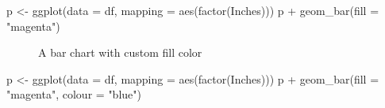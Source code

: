\documentclass[
  letterpaper,
]{article}
\newenvironment{Shaded}{\begin{snugshade}}{\end{snugshade}}
\newcommand{\AttributeTok}[1]{\textcolor[rgb]{0.40,0.45,0.13}{#1}}
\newcommand{\FunctionTok}[1]{\textcolor[rgb]{0.28,0.35,0.67}{#1}}
\newcommand{\NormalTok}[1]{\textcolor[rgb]{0.00,0.23,0.31}{#1}}
\newcommand{\OtherTok}[1]{\textcolor[rgb]{0.00,0.23,0.31}{#1}}
\newcommand{\SpecialCharTok}[1]{\textcolor[rgb]{0.37,0.37,0.37}{#1}}
\newcommand{\StringTok}[1]{\textcolor[rgb]{0.13,0.47,0.30}{#1}}
\begin{document}
\begin{Shaded}
\begin{Highlighting}[]
\NormalTok{p }\OtherTok{\textless{}{-}} \FunctionTok{ggplot}\NormalTok{(}\AttributeTok{data =}\NormalTok{ df, }\AttributeTok{mapping =} \FunctionTok{aes}\NormalTok{(}\FunctionTok{factor}\NormalTok{(Inches)))}
\NormalTok{p }\SpecialCharTok{+} \FunctionTok{geom\_bar}\NormalTok{(}\AttributeTok{fill =} \StringTok{"magenta"}\NormalTok{)}
\end{Highlighting}
\end{Shaded}

\begin{figure}[H]


\caption{\label{fig-fill}A bar chart with custom fill color}

\end{figure}%

\begin{Shaded}
\begin{Highlighting}[]
\NormalTok{p }\OtherTok{\textless{}{-}} \FunctionTok{ggplot}\NormalTok{(}\AttributeTok{data =}\NormalTok{ df, }\AttributeTok{mapping =} \FunctionTok{aes}\NormalTok{(}\FunctionTok{factor}\NormalTok{(Inches)))}
\NormalTok{p }\SpecialCharTok{+} \FunctionTok{geom\_bar}\NormalTok{(}\AttributeTok{fill =} \StringTok{"magenta"}\NormalTok{, }\AttributeTok{colour =} \StringTok{"blue"}\NormalTok{)}
\end{Highlighting}
\end{Shaded}
\end{document}
